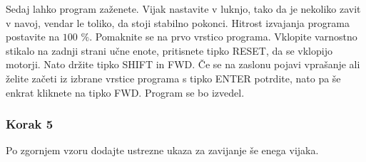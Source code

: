 Sedaj lahko program zaženete. Vijak nastavite v luknjo, tako da je nekoliko zavit v navoj, vendar le toliko, da stoji stabilno pokonci. Hitrost izvajanja programa postavite na $100$ $\%$. Pomaknite se na prvo vrstico programa. Vklopite varnostno stikalo na zadnji strani učne enote, pritisnete tipko RESET, da se vklopijo motorji. Nato držite tipko SHIFT in FWD. Če se na zaslonu pojavi vprašanje ali želite začeti iz izbrane vrstice programa s tipko ENTER potrdite, nato pa še enkrat kliknete na tipko FWD. Program se bo izvedel.

\subsubsection{Korak 5} Po zgornjem vzoru dodajte ustrezne ukaza za zavijanje še enega vijaka.